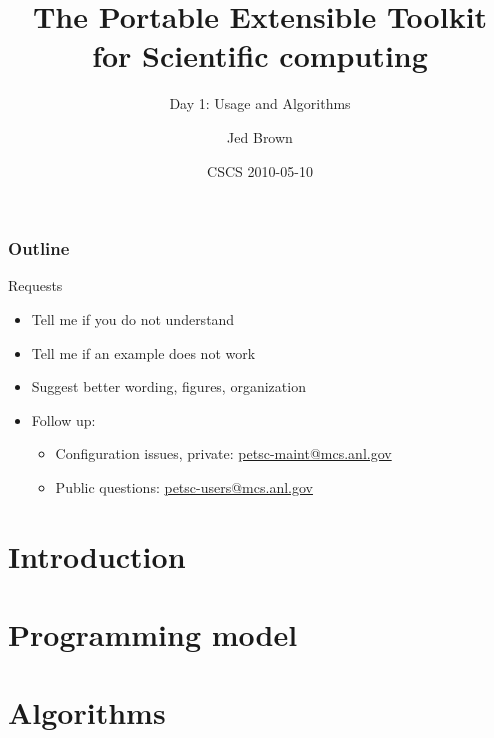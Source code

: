 \documentclass{beamer}
\title[PETSc day 1]{The Portable Extensible Toolkit for Scientific computing}
\subtitle{Day 1: Usage and Algorithms}
\author{Jed Brown}
\institute[ETH Z\"urich]
{

}
\date{CSCS 2010-05-10}
\begin{document}
\lstset{language=C}

\begin{frame}
\titlepage
\end{frame}

\begin{frame}
\frametitle{Outline}
\tableofcontents
\end{frame}

\begin{frame}{Requests}
  \begin{itemize}
  \item Tell me if you do not understand
  \item Tell me if an example does not work
  \item Suggest better wording, figures, organization
  \item Follow up:
    \begin{itemize}
    \item Configuration issues, private: \url{petsc-maint@mcs.anl.gov}
    \item Public questions: \url{petsc-users@mcs.anl.gov}
    \end{itemize}
  \end{itemize}
\end{frame}

\section{Introduction}





\section{Programming model}





\section{Algorithms}

% 
% 
% 

\end{document}
